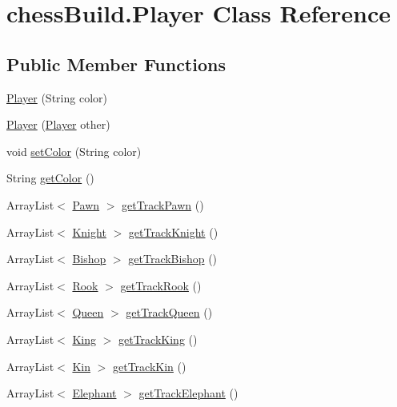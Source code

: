 \hypertarget{classchess_build_1_1_player}{}\section{chess\+Build.\+Player Class Reference}
\label{classchess_build_1_1_player}
\subsection*{Public Member Functions}
\begin{DoxyCompactItemize}
\item 
\hyperlink{classchess_build_1_1_player_af6d8214f5ad0c21e5801c920aa1449db}{Player} (String color)
\item 
\hyperlink{classchess_build_1_1_player_a427c6aeab40552829c8d387b8908c1a1}{Player} (\hyperlink{classchess_build_1_1_player}{Player} other)
\item 
void \hyperlink{classchess_build_1_1_player_abc3aee1d3b1ce4ab0a12d2c544cc7e08}{set\+Color} (String color)
\item 
String \hyperlink{classchess_build_1_1_player_a2d04858909da7c3313939ab657c7541b}{get\+Color} ()
\item 
Array\+List$<$ \hyperlink{classchess_build_1_1_pawn}{Pawn} $>$ \hyperlink{classchess_build_1_1_player_a031a92644a92ed146404db4332f76303}{get\+Track\+Pawn} ()
\item 
Array\+List$<$ \hyperlink{classchess_build_1_1_knight}{Knight} $>$ \hyperlink{classchess_build_1_1_player_af50e14cc2f948a18460bb09278c44016}{get\+Track\+Knight} ()
\item 
Array\+List$<$ \hyperlink{classchess_build_1_1_bishop}{Bishop} $>$ \hyperlink{classchess_build_1_1_player_a381227f722157384cbd9fa1730374e09}{get\+Track\+Bishop} ()
\item 
Array\+List$<$ \hyperlink{classchess_build_1_1_rook}{Rook} $>$ \hyperlink{classchess_build_1_1_player_a24e07f2fb2000ac07bc7e350b7ba5715}{get\+Track\+Rook} ()
\item 
Array\+List$<$ \hyperlink{classchess_build_1_1_queen}{Queen} $>$ \hyperlink{classchess_build_1_1_player_aef2b846009857d7387fdcbf28b111338}{get\+Track\+Queen} ()
\item 
Array\+List$<$ \hyperlink{classchess_build_1_1_king}{King} $>$ \hyperlink{classchess_build_1_1_player_a62347626dff2ff6a2e63d33b4bcb5174}{get\+Track\+King} ()
\item 
Array\+List$<$ \hyperlink{classchess_build_1_1_kin}{Kin} $>$ \hyperlink{classchess_build_1_1_player_aed6e29a8e82ce3ae654b1773cb403cf3}{get\+Track\+Kin} ()
\item 
Array\+List$<$ \hyperlink{classchess_build_1_1_elephant}{Elephant} $>$ \hyperlink{classchess_build_1_1_player_ad45b47c46c9940e067b7d23f765ed2ce}{get\+Track\+Elephant} ()
\end{DoxyCompactItemize}


